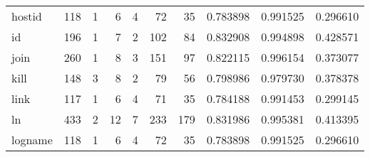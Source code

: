 \begin{tabular}{lrrrrrrrrr}
hostid    &                    118 &                                  1 &                                 6 &                                4 &                                72 &                              35 &                                0.783898 &                               0.991525 &                             0.296610 \\
id        &                    196 &                                  1 &                                 7 &                                2 &                               102 &                              84 &                                0.832908 &                               0.994898 &                             0.428571 \\
join      &                    260 &                                  1 &                                 8 &                                3 &                               151 &                              97 &                                0.822115 &                               0.996154 &                             0.373077 \\
kill      &                    148 &                                  3 &                                 8 &                                2 &                                79 &                              56 &                                0.798986 &                               0.979730 &                             0.378378 \\
link      &                    117 &                                  1 &                                 6 &                                4 &                                71 &                              35 &                                0.784188 &                               0.991453 &                             0.299145 \\
ln        &                    433 &                                  2 &                                12 &                                7 &                               233 &                             179 &                                0.831986 &                               0.995381 &                             0.413395 \\
logname   &                    118 &                                  1 &                                 6 &                                4 &                                72 &                              35 &                                0.783898 &                               0.991525 &                             0.296610 \\

\end{tabular}
